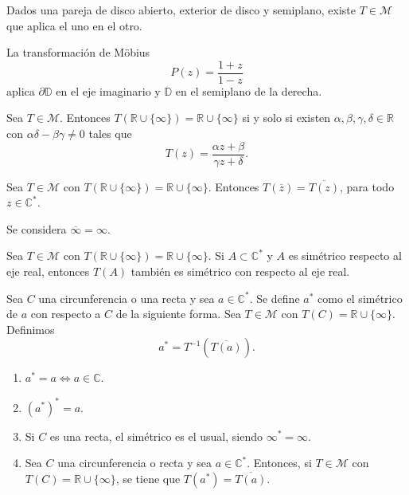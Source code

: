 \begin{remark}
    Dados una pareja de disco abierto, exterior de disco y semiplano, existe $T \in \mathcal{M}$ que aplica el uno en el otro.
\end{remark}

\begin{example}
    La transformación de Möbius
    $$P(z) = \frac{1+z}{1-z}$$
    aplica $\partial\mathbb{D}$ en el eje imaginario y $\mathbb{D}$ en el semiplano de la derecha.
\end{example}

\begin{proposition}
    Sea $T \in \mathcal{M}$.
    Entonces $T(\mathbb{R} \cup \{\infty\}) = \mathbb{R} \cup \{\infty\}$ si y solo si existen $\alpha, \beta, \gamma, \delta \in \mathbb{R}$ con $\alpha\delta - \beta\gamma \neq 0$ tales que
    $$T(z) = \frac{\alpha z + \beta}{\gamma z + \delta}.$$
\end{proposition}

\begin{lemma}
    Sea $T \in \mathcal{M}$ con $T(\mathbb{R} \cup \{\infty\}) = \mathbb{R} \cup \{\infty\}$.
    Entonces $T(\overline{z}) = \overline{T(z)}$, para todo $z \in \mathbb{C}^\ast$.
\end{lemma}

\begin{remark}
    Se considera $\overline{\infty} = \infty$.
\end{remark}

\begin{remark}
    Sea $T \in \mathcal{M}$ con $T(\mathbb{R} \cup \{\infty\}) = \mathbb{R} \cup \{\infty\}$.
    Si $A \subset \mathbb{C}^\ast$ y $A$ es simétrico respecto al eje real, entonces $T(A)$ también es simétrico con respecto al eje real.
\end{remark}

\begin{definition}
    Sea $C$ una circunferencia o una recta y sea $a \in \mathbb{C}^\ast$.
    Se define $a^\ast$ como el simétrico de $a$ con respecto a $C$ de la siguiente forma.
    Sea $T \in \mathcal{M}$ con $T(C) = \mathbb{R} \cup \{\infty\}$.
    Definimos
    $$a^\ast = T^{-1}(\overline{T(a)}).$$
\end{definition}

\begin{remark}
    \hfill
    \begin{enumerate}
        \item $a^\ast = a \Leftrightarrow a \in \mathbb{C}$.
        \item $(a^\ast)^\ast = a$.
        \item Si $C$ es una recta, el simétrico es el usual, siendo $\infty^\ast = \infty$.
        \item Sea $C$ una circunferencia o recta y sea $a \in \mathbb{C}^\ast$.
              Entonces, si $T \in \mathcal{M}$ con $T(C) = \mathbb{R} \cup \{\infty\}$, se tiene que $T(a^\ast) = \overline{T(a)}$.
    \end{enumerate}
\end{remark}

